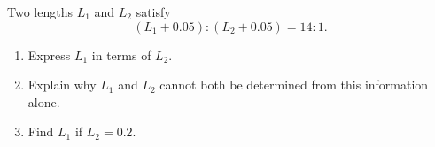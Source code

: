 Two lengths $L_1$ and $L_2$ satisfy
\[(L_1+0.05):(L_2+0.05)=14:1.\]
\begin{enumerate}
\item[(a)] Express $L_1$ in terms of $L_2$.
\item[(b)] Explain why $L_1$ and $L_2$ cannot both be determined from this information alone.
\item[(c)] Find $L_1$ if $L_2=0.2$.
\end{enumerate}

